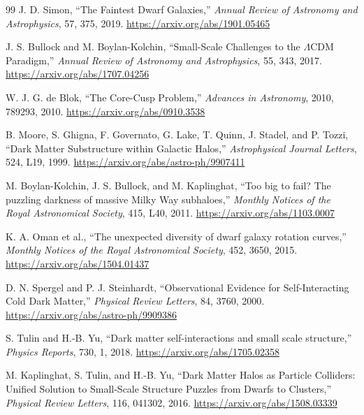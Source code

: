\begin{thebibliography}{99}
J. D. Simon,
``The Faintest Dwarf Galaxies,''
\emph{Annual Review of Astronomy and Astrophysics}, 57, 375, 2019.
\url{https://arxiv.org/abs/1901.05465}

J. S. Bullock and M. Boylan-Kolchin,
``Small-Scale Challenges to the $\Lambda$CDM Paradigm,''
\emph{Annual Review of Astronomy and Astrophysics}, 55, 343, 2017.
\url{https://arxiv.org/abs/1707.04256}

W. J. G. de Blok,
``The Core-Cusp Problem,''
\emph{Advances in Astronomy}, 2010, 789293, 2010.
\url{https://arxiv.org/abs/0910.3538}

B. Moore, S. Ghigna, F. Governato, G. Lake, T. Quinn, J. Stadel, and P. Tozzi,
``Dark Matter Substructure within Galactic Halos,''
\emph{Astrophysical Journal Letters}, 524, L19, 1999.
\url{https://arxiv.org/abs/astro-ph/9907411}

M. Boylan-Kolchin, J. S. Bullock, and M. Kaplinghat,
``Too big to fail? The puzzling darkness of massive Milky Way subhaloes,''
\emph{Monthly Notices of the Royal Astronomical Society}, 415, L40, 2011.
\url{https://arxiv.org/abs/1103.0007}

K. A. Oman et al.,
``The unexpected diversity of dwarf galaxy rotation curves,''
\emph{Monthly Notices of the Royal Astronomical Society}, 452, 3650, 2015.
\url{https://arxiv.org/abs/1504.01437}

D. N. Spergel and P. J. Steinhardt,
``Observational Evidence for Self-Interacting Cold Dark Matter,''
\emph{Physical Review Letters}, 84, 3760, 2000.
\url{https://arxiv.org/abs/astro-ph/9909386}

S. Tulin and H.-B. Yu,
``Dark matter self-interactions and small scale structure,''
\emph{Physics Reports}, 730, 1, 2018.
\url{https://arxiv.org/abs/1705.02358}

M. Kaplinghat, S. Tulin, and H.-B. Yu,
``Dark Matter Halos as Particle Colliders: Unified Solution to Small-Scale Structure Puzzles from Dwarfs to Clusters,''
\emph{Physical Review Letters}, 116, 041302, 2016.
\url{https://arxiv.org/abs/1508.03339}


\end{thebibliography}
